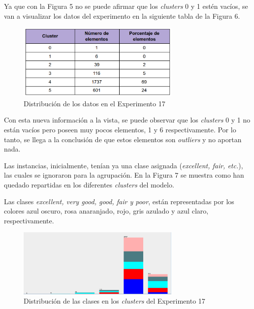 \documentclass[12pt,a4paper, xcolor=table]{article}
\begin{document}
Ya que con la Figura 5 no se puede afirmar que los \textit{clusters} 0 y 1 estén vacíos, se van a visualizar los datos del experimento en la siguiente tabla de la Figura 6.

\begin{figure}[!h]
    \centering
    \includegraphics[width=300px]{img/clusters_mejor_exp.png}
    \caption{Distribución de los datos en el Experimento 17}
\end{figure}


Con esta nueva información a la vista, se puede observar que los \textit{clusters} 0 y 1 no están vacíos pero poseen muy pocos elementos, 1 y 6 respectivamente. Por lo tanto, se llega a la conclusión de que estos elementos son \textit{outliers} y no aportan nada.

\vspace{4mm}

Las instancias, inicialmente, tenían ya una clase asignada (\textit{excellent, fair, etc.}), las cuales se ignoraron para la agrupación. En la Figura 7 se muestra como han quedado repartidas en los diferentes \textit{clusters} del modelo.

\vspace{2mm}

Las clases \textit{excellent, very good, good, fair y poor}, están representadas por los colores azul oscuro, rosa anaranjado, rojo, gris azulado y azul claro, respectivamente.

\begin{figure}[!h]
  \centering
  \includegraphics[width=300px]{img/clusters_class.png}
  \caption{Distribución de las clases en los \textit{clusters} del Experimento 17}
\end{figure}

\newpage
\end{document}
